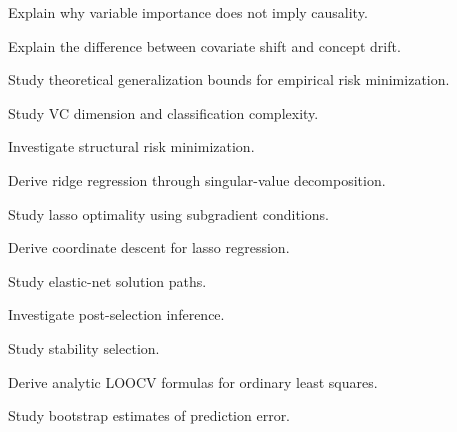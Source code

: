 \begin{exercise}[3]
Explain why variable importance does not imply causality.
\end{exercise}

\begin{exercise}[3]
Explain the difference between covariate shift and concept drift.
\end{exercise}

\begin{exercise}[4]
Study theoretical generalization bounds for empirical risk minimization.
\end{exercise}

\begin{exercise}[4]
Study VC dimension and classification complexity.
\end{exercise}

\begin{exercise}[4]
Investigate structural risk minimization.
\end{exercise}

\begin{exercise}[4]
Derive ridge regression through singular-value decomposition.
\end{exercise}

\begin{exercise}[4]
Study lasso optimality using subgradient conditions.
\end{exercise}

\begin{exercise}[4]
Derive coordinate descent for lasso regression.
\end{exercise}

\begin{exercise}[4]
Study elastic-net solution paths.
\end{exercise}

\begin{exercise}[4]
Investigate post-selection inference.
\end{exercise}

\begin{exercise}[4]
Study stability selection.
\end{exercise}

\begin{exercise}[4]
Derive analytic LOOCV formulas for ordinary least squares.
\end{exercise}

\begin{exercise}[4]
Study bootstrap estimates of prediction error.
\end{exercise}

